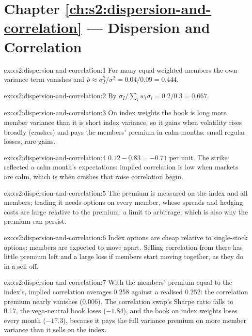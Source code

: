 \section*{Chapter \ref{ch:s2:dispersion-and-correlation} --- Dispersion and Correlation}

\begin{solution}{exo:s2:dispersion-and-correlation:1}
For many equal-weighted members the own-variance term vanishes and $\bar\rho \approx \sigma_I^2/\sigma^2 = 0.04/0.09 = 0.444$.
\end{solution}

\begin{solution}{exo:s2:dispersion-and-correlation:2}
By $\sigma_I/\sum_i w_i\sigma_i = 0.2/0.3 = 0.667$.
\end{solution}

\begin{solution}{exo:s2:dispersion-and-correlation:3}
On index weights the book is long more member variance than it is short index variance, so it gains when volatility rises broadly (crashes) and pays
the members' premium in calm months: small regular losses, rare gains.
\end{solution}

\begin{solution}{exo:s2:dispersion-and-correlation:4}
$0.12 - 0.83 = -0.71$ per unit. The strike reflected a calm month's expectations: implied correlation is low when markets are calm, which is when crashes
that raise correlation begin.
\end{solution}

\begin{solution}{exo:s2:dispersion-and-correlation:5}
The premium is measured on the index and all members; trading it needs options on every member, whose spreads and hedging costs are large relative to
the premium: a limit to arbitrage, which is also why the premium can persist.
\end{solution}

\begin{solution}{exo:s2:dispersion-and-correlation:6}
Index options are cheap relative to single-stock options: members are expected to move apart. Selling correlation from there has little premium left and
a large loss if members start moving together, as they do in a sell-off.
\end{solution}

\begin{solution}{exo:s2:dispersion-and-correlation:7}
With the members' premium equal to the index's, implied correlation averages 0.258 against a realised 0.252: the correlation premium nearly vanishes
(0.006). The correlation swap's Sharpe ratio falls to 0.17, the vega-neutral book loses ($-1.84$), and the book on index weights loses every month
($-17.3$), because it pays the full variance premium on more member variance than it sells on the index.
\end{solution}

